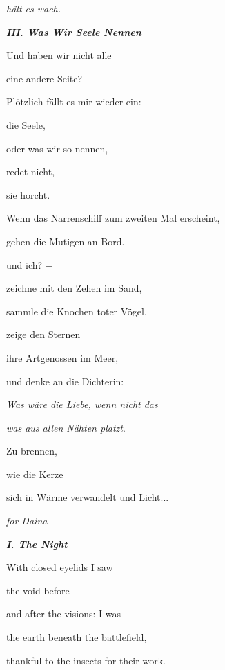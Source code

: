 \emph{
hält es wach.}


\bigskip

{\bfseries\itshape
III. Was Wir Seele Nennen}


\bigskip

Und haben wir nicht alle

eine andere Seite?


\bigskip

Plötzlich fällt es mir wieder ein:

die Seele,

oder was wir so nennen,

redet nicht,

sie horcht.


\bigskip

Wenn das Narrenschiff zum zweiten Mal erscheint,

gehen die Mutigen an Bord. 

und ich? $-$


\bigskip

zeichne mit den Zehen im Sand,

sammle die Knochen toter Vögel,

zeige den Sternen 

ihre Artgenossen im Meer,


\bigskip

und denke an die Dichterin:

\emph{
Was wäre die Liebe, wenn nicht das}

\emph{was aus allen Nähten platzt}.


\bigskip

Zu brennen,

wie die Kerze

sich in Wärme verwandelt und Licht...


\bigskip


\bigskip


\emph{
for Daina}


\bigskip

{\bfseries\itshape
I. The Night}


\bigskip

With closed eyelids I saw

the void before

and after the visions: I was

the earth beneath the battlefield,

thankful to the insects for their work.


\bigskip

